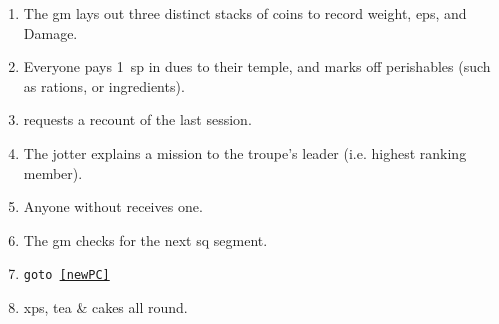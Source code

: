 
\begin{enumerate}
  \item
  The \gls{gm} lays out three distinct stacks of coins to record \gls{weight}, \glspl{ep}, and Damage.
  \item
  Everyone pays 1~\gls{sp} in dues to their temple, and marks off perishables (such as \glspl{ration}, or \glspl{ingredient}).
  \item
   requests a recount of the last session.
  \item
  The \gls{jotter} explains a mission to the troupe's leader (i.e. highest ranking member).
  \item
  Anyone without  receives one.
  \label{newPC}
  \item
  The \gls{gm} checks for the next \gls{sq} \gls{segment}.
  \item
  {\tt goto \ref{newPC}}
  \item
  \Glspl{xp}, tea \& cakes all round.
\end{enumerate}

